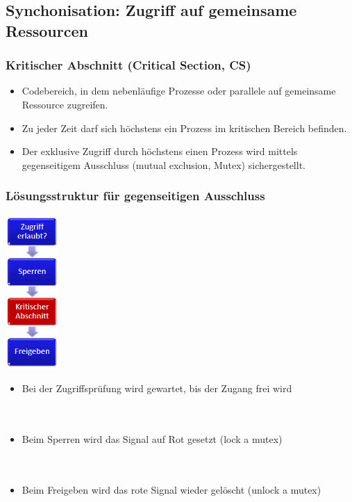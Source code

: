\subsection{Synchonisation: Zugriff auf gemeinsame Ressourcen}
\subsubsection{Kritischer Abschnitt (Critical Section, CS)}
\begin{itemize}
  \item Codebereich, in dem nebenläufige Prozesse oder parallele auf gemeinsame Ressource
  zugreifen. 
  \item Zu jeder Zeit darf sich höchstens ein Prozess im kritischen Bereich
  befinden. 
  \item Der exklusive Zugriff durch höchstens einen Prozess wird mittels gegenseitigem Ausschluss (mutual exclusion, Mutex) sichergestellt. 
\end{itemize}
\subsubsection{Lösungsstruktur für gegenseitigen Ausschluss}
\begin{minipage}[c]{2cm}
\includegraphics[width=2cm]{images/Concurrency/Loesungsstruktur.png}
\end{minipage}
\begin{minipage}[c]{14cm}
\begin{itemize}
\item Bei der Zugriffsprüfung wird gewartet, bis der Zugang frei wird \\ \ \\ \ \\
\item Beim Sperren wird das Signal auf Rot gesetzt (lock a mutex) \\ \ \\ \ \\ 
\item Beim Freigeben wird das rote Signal wieder gelöscht (unlock a mutex)
\end{itemize}
\end{minipage}
